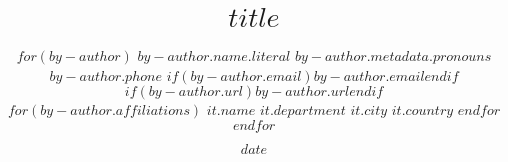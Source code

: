 \title{ \vspace{-1.5em}
\bf $title$ \vspace{-.5em}
}
\author{
  $for(by-author)$
    {$by-author.name.literal$ 
    \authorcr %
    $by-author.metadata.pronouns$
    \authorcr
    $by-author.phone$
    \authorcr
    $if(by-author.email)$\href{mailto:$by-author.email$}{$by-author.email$}$endif$}
    \authorcr
    $if(by-author.url)$\href{$by-author.url$}{$by-author.url$}$endif$
    

    $for(by-author.affiliations)$
      $it.name$
      \authorcr
      $it.department$
      \authorcr
      $it.city$ $it.country$
    $endfor$
  $endfor$}

\date{$date$}


